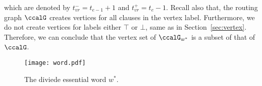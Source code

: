 \documentclass[Afour,sageh,times]{sagej}
\begin{document}
{%
which are denoted by $t_{vr}^- = t_{e-1}+1$ and $t_{vr}^+ = t_{e}-1$. Recall also that, the routing graph $\ccalG$ creates vertices for all clauses in the vertex label.  Furthermore, we do not create vertices for labels either $\top$ or $\bot$, same as in Section~\ref{sec:vertex}. Therefore, we can conclude that the vertex set of $\ccalG_{w^*}$ is a subset of that of $\ccalG$.

\begin{figure}[!t]
  \centering
  \texttt{[image: word.pdf]}
  \caption{The diviede essential word $w^*$.}
  \label{fig:word}
\end{figure}

}
\end{document}
